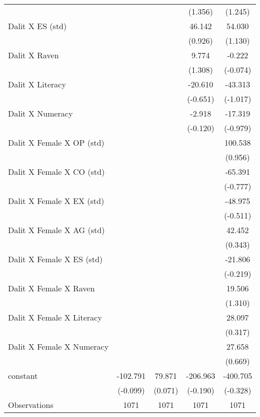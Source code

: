 \begin{table}[htbp]
{\begin{tabular}{lcccc}
          &       &       & (1.356) & (1.245) \\
    Dalit X ES (std) &       &       & 46.142 & 54.030 \\
          &       &       & (0.926) & (1.130) \\
    Dalit X Raven &       &       & 9.774 & -0.222 \\
          &       &       & (1.308) & (-0.074) \\
    Dalit X Literacy &       &       & -20.610 & -43.313 \\
          &       &       & (-0.651) & (-1.017) \\
    Dalit X Numeracy &       &       & -2.918 & -17.319 \\
          &       &       & (-0.120) & (-0.979) \\
    Dalit X Female X OP (std) &       &       &       & 100.538 \\
          &       &       &       & (0.956) \\
    Dalit X Female X CO (std) &       &       &       & -65.391 \\
          &       &       &       & (-0.777) \\
    Dalit X Female X EX (std) &       &       &       & -48.975 \\
          &       &       &       & (-0.511) \\
    Dalit X Female X AG (std) &       &       &       & 42.452 \\
          &       &       &       & (0.343) \\
    Dalit X Female X ES (std) &       &       &       & -21.806 \\
          &       &       &       & (-0.219) \\
    Dalit X Female X Raven &       &       &       & 19.506 \\
          &       &       &       & (1.310) \\
    Dalit X Female X Literacy &       &       &       & 28.097 \\
          &       &       &       & (0.317) \\
    Dalit X Female X Numeracy &       &       &       & 27.658 \\
          &       &       &       & (0.669) \\
    constant & -102.791 & 79.871 & -206.963 & -400.705 \\
          & (-0.099) & (0.071) & (-0.190) & (-0.328) \\
    \midrule
    Observations & 1071  & 1071  & 1071  & 1071 \\

\end{tabular}}
\end{table}
